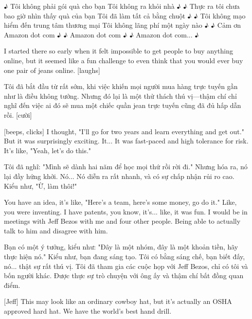 \documentclass[a4paper]{article}
\begin{document}
	\begin{vietnamese-v2}
		♪ Tôi không phải gói quà cho bạn Tôi không ra khỏi nhà ♪
		♪ Thực ra tôi chưa bao giờ nhìn thấy quà của bạn Tôi đã làm tất cả bằng chuột ♪
		♪ Tôi không mạo hiểm đến trung tâm thương mại Tôi không lãng phí một ngày nào ♪
		♪ Cảm ơn Amazon dot com ♪
		♪ Amazon dot com ♪
		♪ Amazon dot com... ♪
	\end{vietnamese-v2}
	
	I started there so early when it felt impossible to get people to buy anything online, but it seemed like a fun challenge to even think that you would ever buy one pair of jeans online. [laughs]
	
	\begin{vietnamese-v2}
		Tôi đã bắt đầu từ rất sớm, khi việc khiến mọi người mua hàng trực tuyến gần như là điều không tưởng. 
		Nhưng đó lại là một thử thách thú vị—thậm chí chỉ nghĩ đến việc ai đó sẽ mua một chiếc quần jean trực tuyến cũng đã đủ hấp dẫn rồi. [cười]
	\end{vietnamese-v2}
	
	[beeps, clicks]
	I thought, "I'll go for two years and learn everything and get out." But it was surprisingly exciting.
	It... It was fast-paced and high tolerance for risk. It's like, "Yeah, let's do this."

	\begin{vietnamese-v2}
		Tôi đã nghĩ: "Mình sẽ dành hai năm để học mọi thứ rồi rời đi." 
		Nhưng hóa ra, nó lại đầy hứng khởi. 
		Nó... Nó diễn ra rất nhanh, và có sự chấp nhận rủi ro cao. Kiểu như, "Ừ, làm thôi!"
	\end{vietnamese-v2}

	You have an idea, it's like, "Here's a team, here's some money, go do it."
	Like, you were inventing. I have patents, you know, it's... like, it was fun.
	I would be in meetings with Jeff Bezos with me and four other people.
	Being able to actually talk to him and disagree with him.

	\begin{vietnamese-v2}
		Bạn có một ý tưởng, kiểu như: "Đây là một nhóm, đây là một khoản tiền, hãy thực hiện nó." 
		Kiểu như, bạn đang sáng tạo. 
		Tôi có bằng sáng chế, bạn biết đấy, nó... thật sự rất thú vị. 
		Tôi đã tham gia các cuộc họp với Jeff Bezos, chỉ có tôi và bốn người khác. Được thực sự trò chuyện với ông ấy và thậm chí bất đồng quan điểm.
	\end{vietnamese-v2}

	[Jeff] This may look like an ordinary cowboy hat, but it's actually an OSHA approved hard hat.
	We have the world's best hand drill.
	
\end{document}
